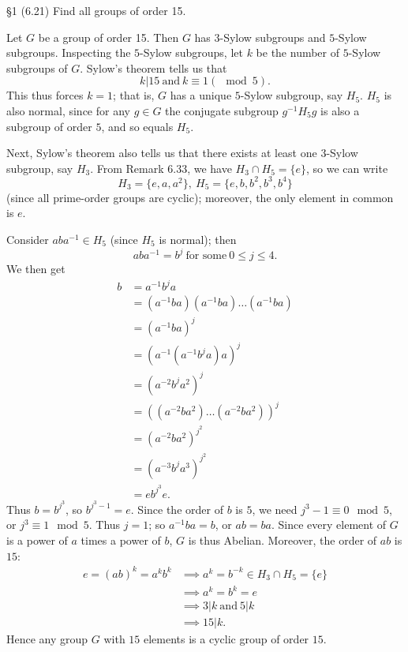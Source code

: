\documentclass{homework}
\begin{document}
\begin{problem}{\S 1}
  (6.21) Find all groups of order 15.
\end{problem}
\begin{solution}
  Let $G$ be a group of order 15. Then $G$ has $3$-Sylow subgroups and $5$-Sylow subgroups.
  Inspecting the $5$-Sylow subgroups, let $k$ be the number of $5$-Sylow subgroups of $G$. Sylow's
  theorem tells us that \[
    k|15 ~\text{and}~k\equiv 1(\mod{5})
  .\] This thus forces $k=1$; that is, $G$ has a unique $5$-Sylow subgroup, say $H_5$. $H_5$ is also
  normal, since for any $g\in G$ the conjugate subgroup $g^{-1}H_5g$ is also a subgroup of order
  $5$, and so equals $H_5$.

  Next, Sylow's theorem also tells us that there exists at least one $3$-Sylow subgroup, say $H_3$.
  From Remark 6.33, we have $H_3\cap H_5=\{ e \}$, so we can write \[
    H_3=\{ e,a,a^2 \},\ H_5=\{ e,b,b^2,b^3,b^4 \}
  \] (since all prime-order groups are cyclic); moreover, the only element in common is $e$.

  Consider $aba^{-1}\in H_5$ (since $H_5$ is normal); then \[
    aba^{-1}=b^{j}~\text{for some}~0\le j\le 4
  .\] We then get
  \begin{align*}
    b&=a^{-1}b^{j}a\\
     &=(a^{-1}ba)(a^{-1}ba)\ldots(a^{-1}ba)\\
     &= (a^{-1}ba)^j \\
     &= (a^{-1}(a^{-1}b^ja)a)^{j} \\
     &= (a^{-2}b^ja^2)^{j} \\
     &= ((a^{-2}ba^2)\ldots(a^{-2}ba^2))^{j} \\
     &= (a^{-2}ba^2)^{j^2}\\
     &= (a^{-3}b^{j}a^3)^{j^2} \\
     &= eb^{j^3}e
  .\end{align*}
  Thus $b=b^{j^3}$, so $b^{j^3-1}=e$. Since the order of $b$ is $5$, we need $j^3-1\equiv 0\mod{5}$,
  or $j^3\equiv 1\mod{5}$. Thus $j=1$; so $a^{-1}ba=b$, or $ab=ba$. Since every element of $G$ is a
  power of $a$ times a power of $b$, $G$ is thus Abelian. Moreover, the order of $ab$ is $15$: 
  \begin{align*}
    e=(ab)^k=a^kb^k&\implies a^{k}=b^{-k}\in H_3\cap H_5=\{ e \}\\
                   &\implies a^k=b^k=e\\
                   &\implies 3|k ~\text{and}~5|k\\
                   &\implies 15|k
  .\end{align*}
  Hence any group $G$ with $15$ elements is a cyclic group of order $15$.
\end{solution}
\end{document}
